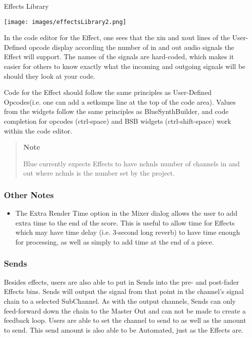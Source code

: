 Effects Library

\texttt{[image: images/effectsLibrary2.png]}

In the code editor for the Effect, one sees that the xin and xout lines
of the User-Defined opcode display according the number of in and out
audio signals the Effect will support. The names of the signals are
hard-coded, which makes it easier for others to know exactly what the
incoming and outgoing signals will be should they look at your code.

Code for the Effect should follow the same principles as User-Defined
Opcodes(i.e. one can add a setksmps line at the top of the code area).
Values from the widgets follow the same principles as BlueSynthBuilder,
and code completion for opcodes (ctrl-space) and BSB widgets
(ctrl-shift-space) work within the code editor.

\begin{quote}
\textbf{Note}

Blue currently expects Effects to have nchnls number of channels in and
out where nchnls is the number set by the project.
\end{quote}

\subsubsection{Other Notes}

\begin{itemize}
\item
  The Extra Render Time option in the Mixer dialog allows the user to
  add extra time to the end of the score. This is useful to allow time
  for Effects which may have time delay (i.e. 3-second long reverb) to
  have time enough for processing, as well as simply to add time at the
  end of a piece.
\end{itemize}

\subsubsection{Sends}

Besides effects, users are also able to put in Sends into the pre- and
post-fader Effects bins. Sends will output the signal from that point in
the channel's signal chain to a selected SubChannel. As with the output
channels, Sends can only feed-forward down the chain to the Master Out
and can not be made to create a feedback loop. Users are able to set the
channel to send to as well as the amount to send. This send amount is
also able to be Automated, just as the Effects are.

